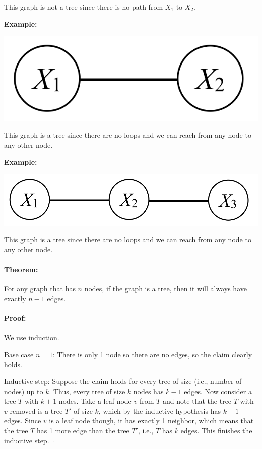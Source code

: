 \documentclass[6008notes.tex]{subfiles}
\begin{document}
This graph is not a tree since there is no path from $X_1$ to $X_2$.

\textbf{Example:}

{\centering\includegraphics[scale=0.4]{images_sec-graphical-models-2-rv-possibly-dependent} \par}

This graph is a tree since there are no loops and we can reach from any node to any other node.

\textbf{Example:}

{\centering\includegraphics[scale=0.4]{images_sec-graphical-models-3-rv-markov-chain} \par}

This graph is a tree since there are no loops and we can reach from any node to any other node.

\paragraph{Theorem:} For any graph that has $n$ nodes, if the graph is a tree, then it will always have exactly $n-1$ edges.

\paragraph{Proof:} We use induction.

Base case $n=1$: There is only 1 node so there are no edges, so the claim clearly holds.

Inductive step: Suppose the claim holds for every tree of size (i.e., number of nodes) up to $k$. Thus, every tree of size $k$ nodes has $k-1$ edges. Now consider a tree $T$ with $k+1$ nodes. Take a leaf node $v$ from $T$ and note that the tree $T$ with $v$ removed is a tree $T'$ of size $k$, which by the inductive hypothesis has $k-1$ edges. Since $v$ is a leaf node though, it has exactly 1 neighbor, which means that the tree $T$ has 1 more edge than the tree $T'$, i.e., $T$ has $k$ edges. This finishes the inductive step. $\square$
\end{document}
